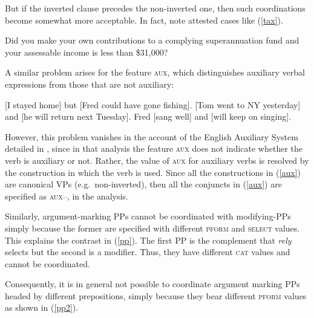 \documentclass[output=paper
                ,modfonts
                ,nonflat
	        ,collection
	        ,collectionchapter
	        ,collectiontoclongg
 	        ,biblatex
                ,babelshorthands
                ,newtxmath
                ,draftmode
                ,colorlinks, citecolor=brown
]{./langsci/langscibook}
\begin{document}
{\noindent
But if the inverted clause precedes the non-inverted one, then such coordinations become somewhat more acceptable. In fact,  \citet[1332--1333]{rodney} note attested cases like 
(\ref{tax}).

\begin{exe}
\ex Did you make your own contributions to a complying superannuation fund and
your assessable income is less than \$31,000?\label{tax}
\end{exe}

\noindent
A similar problem arises for the feature \textsc{aux}, which distinguishes auxiliary verbal expressions from those that
are not auxiliary:

\eal
\label{aux}
\ex {}[I stayed home]\sub{\aux $-$} but [Fred could have gone fishing]\sub{\aux $+$}.
\ex {}[Tom went to NY yesterday]\sub{\aux $-$} and [he will return next Tuesday]\sub{\aux $+$}.
\ex Fred [sang well]\sub{\aux $-$} and [will keep on singing]\sub{\aux $+$}.
\zl

\noindent
However, this problem vanishes in the account of the English Auxiliary System detailed in \citet{SagEtAl20}, since in that analysis
the feature \textsc{aux} does not indicate whether the verb is auxiliary or not. Rather, the value of \textsc{aux} for auxiliary verbs is resolved by the construction in which the verb is used. Since all the constructions in (\ref{aux}) are canonical VPs (e.g.\ non-inverted), then 
all the conjuncts in (\ref{aux}) are specified as \textsc{aux--}, in
the \citet{SagEtAl20} analysis.




Similarly, argument-marking PPs cannot be coordinated with modifying-PPs simply because the former are specified with different  \textsc{pform} and \textsc{select} values. This explains the contrast
in (\ref{pp}). The first PP is the complement that \emph{rely}
selects but the second is a modifier. Thus, they have different \textsc{cat} values 
and cannot be coordinated.


\eal
\label{pp}
\zl

\noindent
Consequently, it is in general not possible to coordinate argument marking PPs headed by different prepositions, simply because they bear
different \textsc{pform} values as shown in (\ref{pp2}).

\eal
\label{pp2}

}
\end{document}
